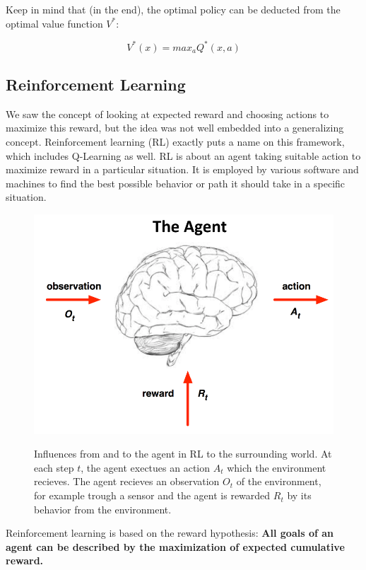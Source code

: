 \documentclass[main]{subfiles}
\begin{document}
Keep in mind that (in the end), the optimal policy can be deducted from the optimal value function $V^*$:

\begin{equation}
    V^*(x) = max_a Q^*(x,a)
\end{equation}


\subsection{Reinforcement Learning}
We saw the concept of looking at expected reward and choosing actions to maximize this reward, but the idea was not well embedded into a generalizing concept. 
Reinforcement learning (RL) exactly puts a name on this framework, which includes Q-Learning as well.
RL is about an agent taking suitable action to maximize reward in a particular situation. 
It is employed by various software and machines to find the best possible behavior or path it should take in a specific situation. 

\begin{figure}[H]
	\centering
	\includegraphics[width=0.9\linewidth]{08_ReinforcementLearning/figures/rl-basic-comps.png}
	\label{fig:rl-basic-comps}
	\caption{Influences from and to the agent in RL to the surrounding world. At each step $t$, the agent exectues an action $A_t$ which the environment recieves. The agent recieves an observation $O_t$ of the environment, for example trough a sensor and the agent is rewarded $R_t$ by its behavior from the environment.}
\end{figure}


Reinforcement learning is based on the reward hypothesis:
\textbf{All goals of an agent can be described by the maximization of expected cumulative reward.}
\end{document}
